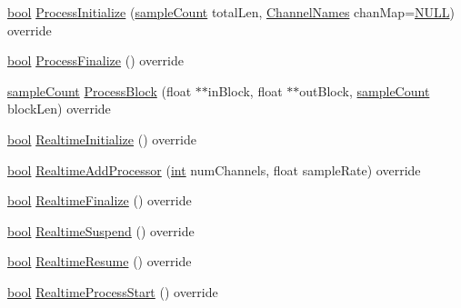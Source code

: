 \begin{DoxyCompactItemize}
\item 
\hyperlink{mac_2config_2i386_2lib-src_2libsoxr_2soxr-config_8h_abb452686968e48b67397da5f97445f5b}{bool} \hyperlink{class_effect_a1de445d3d133a775b237f4a784fbe4ea}{Process\+Initialize} (\hyperlink{include_2audacity_2_types_8h_afa427e1f521ea5ec12d054e8bd4d0f71}{sample\+Count} total\+Len, \hyperlink{include_2audacity_2_types_8h_a4f0f42a04250c39bbe0ce6cb26aa3b48}{Channel\+Names} chan\+Map=\hyperlink{px__mixer_8h_a070d2ce7b6bb7e5c05602aa8c308d0c4}{N\+U\+LL}) override
\item 
\hyperlink{mac_2config_2i386_2lib-src_2libsoxr_2soxr-config_8h_abb452686968e48b67397da5f97445f5b}{bool} \hyperlink{class_effect_af406eb8935fc741a4d1e11432200bd51}{Process\+Finalize} () override
\item 
\hyperlink{include_2audacity_2_types_8h_afa427e1f521ea5ec12d054e8bd4d0f71}{sample\+Count} \hyperlink{class_effect_ab2ee4de9243184cef601ad393b296d53}{Process\+Block} (float $\ast$$\ast$in\+Block, float $\ast$$\ast$out\+Block, \hyperlink{include_2audacity_2_types_8h_afa427e1f521ea5ec12d054e8bd4d0f71}{sample\+Count} block\+Len) override
\item 
\hyperlink{mac_2config_2i386_2lib-src_2libsoxr_2soxr-config_8h_abb452686968e48b67397da5f97445f5b}{bool} \hyperlink{class_effect_ae9d1a1da8ce1c5210b4f5688900fe68b}{Realtime\+Initialize} () override
\item 
\hyperlink{mac_2config_2i386_2lib-src_2libsoxr_2soxr-config_8h_abb452686968e48b67397da5f97445f5b}{bool} \hyperlink{class_effect_ae7540844fb4dd0396cdc3018609e1e6b}{Realtime\+Add\+Processor} (\hyperlink{xmltok_8h_a5a0d4a5641ce434f1d23533f2b2e6653}{int} num\+Channels, float sample\+Rate) override
\item 
\hyperlink{mac_2config_2i386_2lib-src_2libsoxr_2soxr-config_8h_abb452686968e48b67397da5f97445f5b}{bool} \hyperlink{class_effect_aa76287edd16d8e422f4a6d5a1dc715f5}{Realtime\+Finalize} () override
\item 
\hyperlink{mac_2config_2i386_2lib-src_2libsoxr_2soxr-config_8h_abb452686968e48b67397da5f97445f5b}{bool} \hyperlink{class_effect_adc8a00a2df38681cf20a27701d9b18bf}{Realtime\+Suspend} () override
\item 
\hyperlink{mac_2config_2i386_2lib-src_2libsoxr_2soxr-config_8h_abb452686968e48b67397da5f97445f5b}{bool} \hyperlink{class_effect_a014f1b3388175176f85e4bf6e1264bea}{Realtime\+Resume} () override
\item 
\hyperlink{mac_2config_2i386_2lib-src_2libsoxr_2soxr-config_8h_abb452686968e48b67397da5f97445f5b}{bool} \hyperlink{class_effect_a33096caef6c8b47b2880e5930ef4cfa3}{Realtime\+Process\+Start} () override

\end{DoxyCompactItemize}
